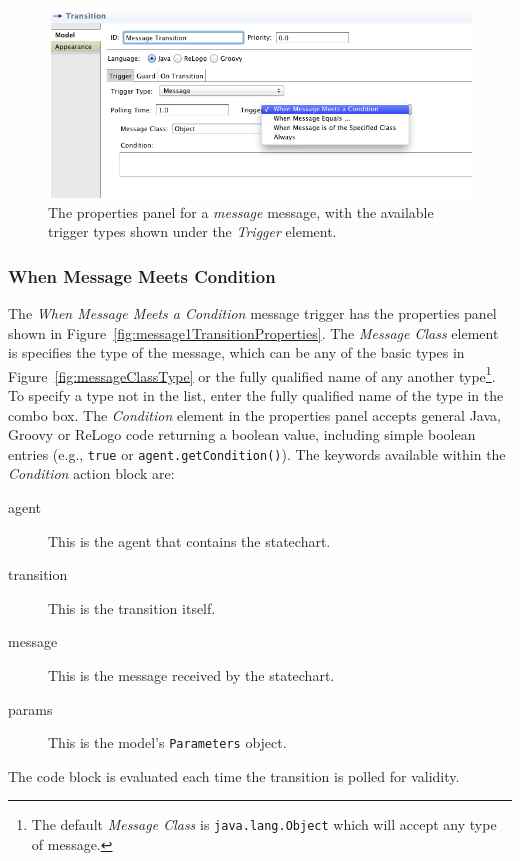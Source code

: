 \documentclass[11pt]{amsart}
\begin{document}
\begin{figure}
\begin{center}
\vspace{.2in}
\centerline {
\includegraphics[width=5in]{StatechartsImages/MessageTransitionProperties.png}
}
\caption{The properties panel for a \emph{message} message, with the available trigger types shown under the \emph{Trigger} element.}
\label{fig:messageTransitionProperties}
\end{center}
\end{figure}
\clearpage

\subsubsection{When Message Meets Condition}
The \emph{When Message Meets a Condition} message trigger has the properties panel shown in Figure~\ref{fig:message1TransitionProperties}. The \emph{Message Class} element is specifies the type of the message, which can be any of the basic types in Figure~\ref{fig:messageClassType} or the fully qualified name of any another type\footnote{The default \emph{Message Class} is \texttt{java.lang.Object} which will accept any type of message.}. To specify a type not in the list, enter the fully qualified name of the type in the combo box. The \emph{Condition} element in the properties panel accepts general Java, Groovy or ReLogo code returning a boolean value, including simple boolean entries (e.g., \texttt{true} or \texttt{agent.getCondition()}). The keywords available within the \emph{Condition} action block are:
\begin{description}
\item[agent] This is the agent that contains the statechart.
\item[transition] This is the transition itself.
\item[message] This is the message received by the statechart.
\item[params] This is the model's \texttt{Parameters} object.
\end{description}
The code block is evaluated each time the transition is polled for validity.
\end{document}
